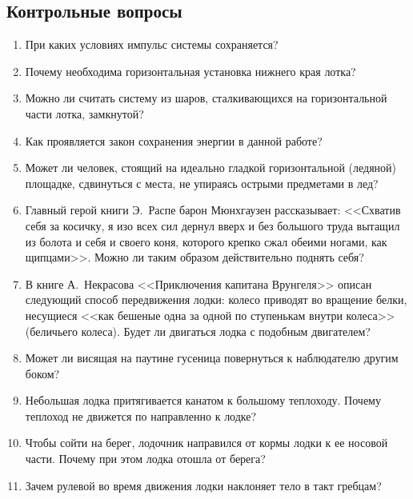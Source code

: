 \documentclass[a4paper, 12pt]{extarticle}
\begin{document}
\subsection{Контрольные вопросы}
\begin{enumerate}
 \item При каких условиях импульс системы сохраняется? 
 \item Почему необходима горизонтальная установка нижнего края лотка? 
 \item
  Можно ли считать систему из шаров, сталкивающихся на горизонтальной части лотка, замкнутой? 
  \item  %
   Как проявляется закон сохранения энергии в данной работе? 
   \item Может ли человек, стоящий на идеально гладкой горизонтальной (ледяной) площадке, сдвинуться с места, не упираясь острыми предметами в лед?  %
   \item Главный герой книги Э.~Распе барон Мюнхгаузен рассказывает: <<Схватив себя за косичку, я изо всех сил дернул вверх и без большого труда вытащил из болота и себя и своего коня, которого крепко сжал обеими ногами, как щипцами>>. Можно ли таким образом действительно поднять себя? 
   \item В книге А.~Некрасова <<Приключения капитана Врунгеля>> описан следующий способ передвижения лодки: колесо приводят во вращение белки, несущиеся <<как бешеные одна за одной по ступенькам внутри колеса>> (беличьего колеса). Будет ли двигаться лодка с подобным двигателем? %
   \item Может ли висящая на паутине гусеница повернуться к наблюдателю другим боком?
   \item Небольшая лодка притягивается канатом к большому теплоходу. Почему теплоход не движется по направленно к лодке? %
   \item Чтобы сойти на берег, лодочник направился от кормы лодки к ее носовой части. Почему при этом лодка отошла от берега? 
   \item Зачем рулевой во время движения лодки наклоняет тело в такт гребцам? %
\end{enumerate}
\end{document}
